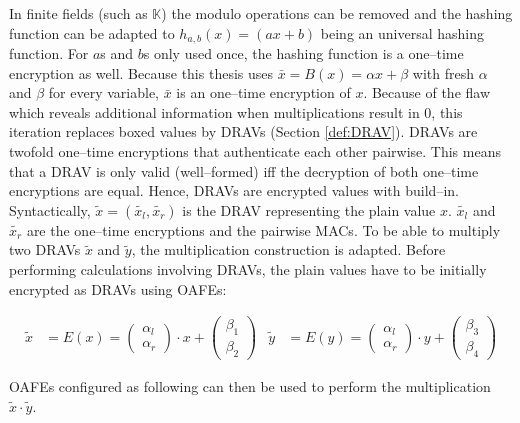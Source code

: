 \noindent{}In finite fields (such as $\mathbb{K}$) the modulo operations can be
removed and the hashing function can be adapted to $h_{a,b}(x) = (ax + b)$ being
an universal hashing function. For $a$s and $b$s only used once, the hashing
function is a one--time encryption as well. Because this thesis uses $\bar{x} =
B(x) = \alpha x + \beta$ with fresh $\alpha$ and $\beta$ for every variable,
$\bar{x}$ is an one--time encryption of $x$. Because of the flaw which reveals
additional information when multiplications result in $0$, this iteration
replaces boxed values by DRAVs (Section \ref{def:DRAV}). DRAVs are twofold
one--time encryptions that authenticate each other pairwise. This means that a
DRAV is only valid (well--formed) iff the decryption of both one--time
encryptions are equal. Hence, DRAVs are encrypted values with  build--in. Syntactically, $\widetilde{x} =
(\widetilde{x_l}, \widetilde{x_r})$ is the DRAV representing the plain value
$x$. $\widetilde{x_l}$ and $\widetilde{x_r}$ are the one--time encryptions and
the pairwise MACs. To be able to multiply two DRAVs $\widetilde{x}$ and
$\widetilde{y}$, the multiplication construction is adapted. Before performing
calculations involving DRAVs, the plain values have to be initially encrypted as
DRAVs using OAFEs:

\begin{align*}
  \widetilde{x} & = E(x) =
\begin{pmatrix}\alpha_l\\\alpha_r\end{pmatrix} \cdot x +
\begin{pmatrix}\beta_1\\\beta_2\end{pmatrix} &
  \widetilde{y} & = E(y) =
\begin{pmatrix}\alpha_l\\\alpha_r\end{pmatrix} \cdot y +
\begin{pmatrix}\beta_3\\\beta_4\end{pmatrix}
\end{align*}

\noindent{}OAFEs configured as following can then be used to perform the
multiplication $\widetilde{x} \cdot \widetilde{y}$.

